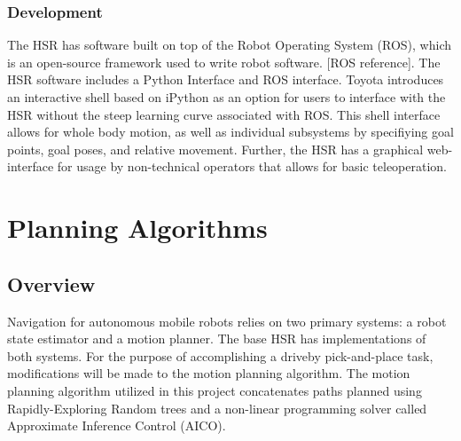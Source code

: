 \documentclass[12pt]{article}
\begin{document}
        \subsubsection{Development}    
            The HSR has software built on top of the Robot Operating System (ROS), which is an open-source framework used to write robot software. [ROS reference]. The HSR software includes a Python Interface and ROS interface. Toyota introduces an interactive shell based on iPython as an option for users to interface with the HSR without the steep learning curve associated with ROS. This shell interface allows for whole body motion, as well as individual subsystems by specifiying goal points, goal poses, and relative movement. Further, the HSR has a graphical web-interface for usage by non-technical operators that allows for basic teleoperation.
    \newpage
\section{Planning Algorithms}
    \subsection{Overview}
        Navigation for autonomous mobile robots relies on two primary systems: a robot state estimator and a motion planner. The base HSR has implementations of both systems. For the purpose of accomplishing a driveby pick-and-place task, modifications will be made to the motion planning algorithm. The motion planning algorithm utilized in this project concatenates paths planned using Rapidly-Exploring Random trees and a non-linear programming solver called Approximate Inference Control (AICO).
\end{document}
